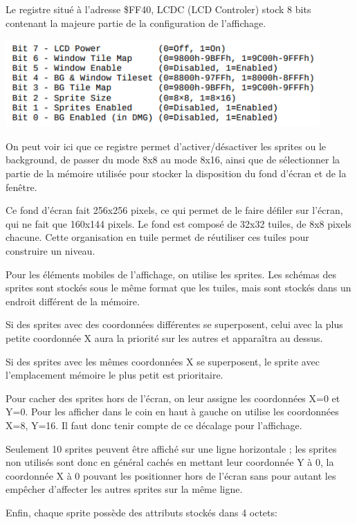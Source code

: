 \documentclass[12pt, a4paper]{article}
\begin{document}
Le registre situé à l'adresse \$FF40, LCDC (LCD Controler) stock 8 bits contenant la majeure partie de la configuration de l'affichage.

\bigskip
\includegraphics[width=12cm]{display.png}
\bigskip

On peut voir ici que ce registre permet d'activer/désactiver les sprites ou le background, de passer du mode 8x8 au mode 8x16, ainsi que de sélectionner la partie de la mémoire utilisée pour stocker la disposition du fond d'écran et de la fenêtre.

\bigskip
Ce fond d'écran fait 256x256 pixels, ce qui permet de le faire défiler sur l'écran, qui ne fait que 160x144 pixels. Le fond est composé de 32x32 tuiles, de 8x8 pixels chacune. Cette organisation en tuile permet de réutiliser ces tuiles pour construire un niveau.
\pagebreak

\bigskip
Pour les éléments mobiles de l'affichage, on utilise les sprites. Les schémas des sprites sont stockés sous le même format que les tuiles, mais sont stockés dans un endroit différent de la mémoire.

\bigskip
Si des sprites avec des coordonnées différentes se superposent, celui avec la plus petite coordonnée X aura la priorité sur les autres et apparaîtra au dessus.

Si des sprites avec les mêmes coordonnées X se superposent, le sprite avec l'emplacement mémoire le plus petit est prioritaire.

\bigskip
Pour cacher des sprites hors de l'écran, on leur assigne les coordonnées X=0 et Y=0. Pour les afficher dans le coin en haut à gauche on utilise les coordonnées X=8, Y=16. Il faut donc tenir compte de ce décalage pour l'affichage.

\bigskip
Seulement 10 sprites peuvent être affiché sur une ligne horizontale ; les sprites non utilisés sont donc en général cachés en mettant leur coordonnée Y à 0, la coordonnée X à 0 pouvant les positionner hors de l'écran sans pour autant les empêcher d'affecter les autres sprites sur la même ligne.

\bigskip
Enfin, chaque sprite possède des attributs stockés dans 4 octets:
\end{document}
